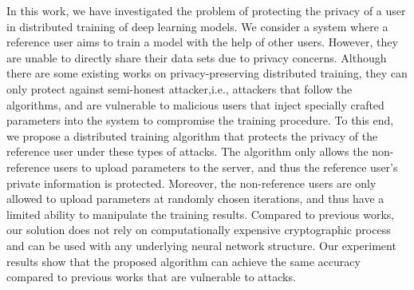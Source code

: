 \documentclass[conference]{IEEEtran}
\begin{document}
In this work, we have investigated the problem of protecting the privacy of a user in distributed training of deep learning models. We
consider a system where a reference user aims to train a model with the help of other users. However, they are unable to directly
share their data sets due to privacy concerns. Although there are some existing works on privacy-preserving distributed training,
they can only protect against semi-honest attacker,i.e., attackers that follow the algorithms,  and are vulnerable to malicious users
that inject specially crafted parameters into the system to compromise the training procedure. To this end, we propose a
distributed training algorithm that protects the privacy of the reference user under these types of attacks. The algorithm only allows
the non-reference users to upload parameters to the server, and thus the reference user's private information is protected. Moreover,
the non-reference users are only allowed to upload parameters at randomly chosen iterations, and thus have a limited ability to
manipulate the training results. Compared to previous works, our solution does not rely on computationally expensive cryptographic
process and can be used with any underlying neural network structure. Our experiment results show that the proposed algorithm can
achieve the same accuracy compared to previous works that are vulnerable to attacks. 



\end{document}
